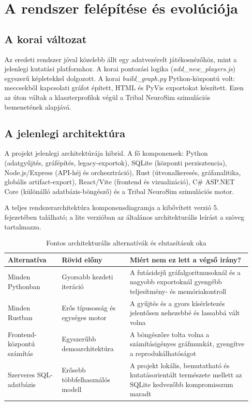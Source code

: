 \chapter{A rendszer felépítése és evolúciója}

\section{A korai változat}

Az eredeti rendszer jóval közelebb állt egy adatvezérelt játékosnézőhöz, mint a jelenlegi kutatási platformhoz. A korai pontozási logika (\textit{add\_new\_players.js}) egyszerű képletekkel dolgozott. A korai \textit{build\_graph.py} Python-központú volt: meccsekből kapcsolati gráfot épített, HTML és PyVis exportokat készített. Ezen az úton váltak a klaszterprofilok végül a Tribal NeuroSim szimulációs bemenetének alapjává.

\section{A jelenlegi architektúra}

A projekt jelenlegi architektúrája hibrid. A fő komponensek: Python (adatgyűjtés, gráfépítés, legacy-exportok), SQLite (központi perzisztencia), Node.js/Express (API-héj és orchesztráció), Rust (útvonalkeresés, gráfanalitika, globális artifact-export), React/Vite (frontend és vizualizáció), C\# ASP.NET Core (különálló adatbázis-böngésző) és a Tribal NeuroSim szimulációs motor.

A teljes rendszerarchitektúra komponensdiagramja a kibővített verzió 5. fejezetében található; a lite verzióban az általános architekturális leírást a szöveg tartalmazza.

\begin{table}[H]
\centering
\caption{Fontos architekturális alternatívák és elutasításuk oka}
\begin{tabularx}{\textwidth}{>{\raggedright\arraybackslash}p{3.5cm} >{\raggedright\arraybackslash}p{3.6cm} X}
\toprule
\textbf{Alternatíva} & \textbf{Rövid előny} & \textbf{Miért nem ez lett a végső irány?} \\
\midrule
Minden Pythonban & Gyorsabb kezdeti iteráció & A futásidejű gráfalgoritmusoknál és a nagyobb exportoknál gyengébb teljesítmény- és memóriakontroll \\
Minden Rustban & Erős típusosság és egységes motor & A gyűjtés és a gyors kísérletezés jelentősen nehezebbé és lassabbá vált volna \\
Frontend-központú számítás & Egyszerűbb demoarchitektúra & A böngészőre tolta volna a számításigényes gráfmunkát, gyengítve a reprodukálhatóságot \\
Szerveres SQL-adatbázis & Erősebb többfelhasználós modell & A projekt lokális, bemutatható és kutatásorientált természete mellett az SQLite kedvezőbb kompromisszum maradt \\
\bottomrule
\end{tabularx}
\end{table}

